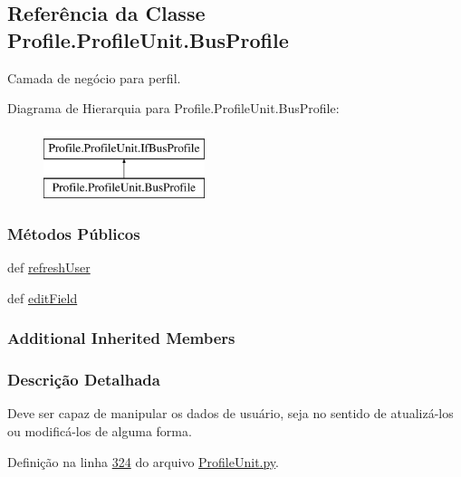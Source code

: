 \hypertarget{classProfile_1_1ProfileUnit_1_1BusProfile}{\subsection{Referência da Classe Profile.\-Profile\-Unit.\-Bus\-Profile}
\label{classProfile_1_1ProfileUnit_1_1BusProfile}
}


Camada de negócio para perfil.  


Diagrama de Hierarquia para Profile.\-Profile\-Unit.\-Bus\-Profile\-:\begin{figure}[H]
\begin{center}
\leavevmode
\includegraphics[height=2.000000cm]{df/da4/classProfile_1_1ProfileUnit_1_1BusProfile}
\end{center}
\end{figure}
\subsubsection*{Métodos Públicos}
\begin{DoxyCompactItemize}
\item 
def \hyperlink{classProfile_1_1ProfileUnit_1_1BusProfile_a87c3d0374f709af7904656938eafd6d3}{refresh\-User}
\item 
def \hyperlink{classProfile_1_1ProfileUnit_1_1BusProfile_a5c116d007081ffefcc1c45cd34c88e10}{edit\-Field}
\end{DoxyCompactItemize}
\subsubsection*{Additional Inherited Members}


\subsubsection{Descrição Detalhada}
Deve ser capaz de manipular os dados de usuário, seja no sentido de atualizá-\/los ou modificá-\/los de alguma forma. 

Definição na linha \hyperlink{ProfileUnit_8py_source_l00324}{324} do arquivo \hyperlink{ProfileUnit_8py_source}{Profile\-Unit.\-py}.



